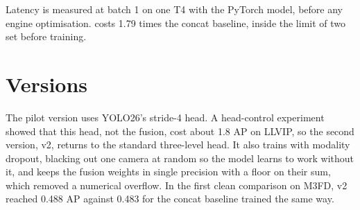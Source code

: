 Latency is measured at batch 1 on one T4 with the PyTorch model, before any engine optimisation. \method{} costs
1.79 times the concat baseline, inside the limit of two set before training.

\section{Versions}

The pilot version uses YOLO26's stride-4 head. A head-control experiment showed that this head, not the fusion,
cost about 1.8 AP on LLVIP, so the second version, \method{} v2, returns to the standard three-level head. It also
trains with modality dropout, blacking out one camera at random so the model learns to work without it, and keeps
the fusion weights in single precision with a floor on their sum, which removed a numerical overflow. In the first
clean comparison on M3FD, \method{} v2 reached 0.488 AP against 0.483 for the concat baseline trained the same way.
